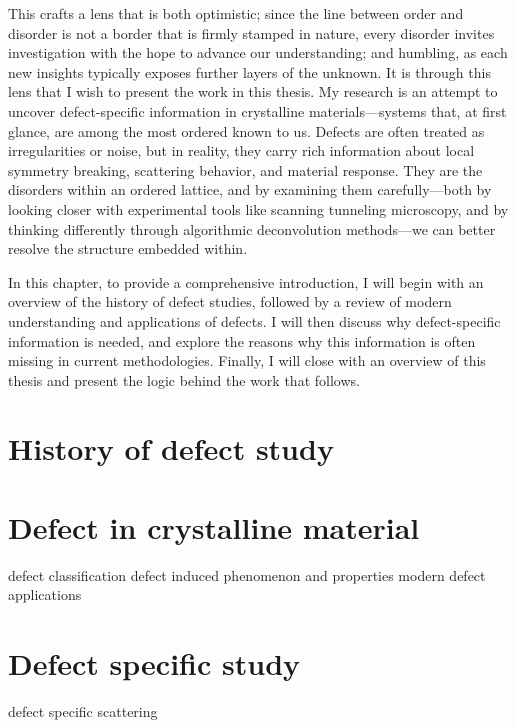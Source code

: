 This crafts a lens that is both optimistic; since the line between order and disorder is not a border that is firmly stamped in nature, every disorder invites investigation with the hope to advance our understanding; and humbling, as each new insights typically exposes further layers of the unknown. It is through this lens that I wish to present the work in this thesis. My research is an attempt to uncover defect-specific information in crystalline materials—systems that, at first glance, are among the most ordered known to us. Defects are often treated as irregularities or noise, but in reality, they carry rich information about local symmetry breaking, scattering behavior, and material response. They are the disorders within an ordered lattice, and by examining them carefully—both by looking closer with experimental tools like scanning tunneling microscopy, and by thinking differently through algorithmic deconvolution methods—we can better resolve the structure embedded within. 

In this chapter, to provide a comprehensive introduction, I will begin with an overview of the history of defect studies, followed by a review of modern understanding and applications of defects. I will then discuss why defect-specific information is needed, and explore the reasons why this information is often missing in current methodologies. Finally, I will close with an overview of this thesis and present the logic behind the work that follows.

\section{History of defect study}

\section{Defect in crystalline material}
defect classification
defect induced phenomenon and properties
modern defect applications
\section{Defect specific study}
defect specific scattering 